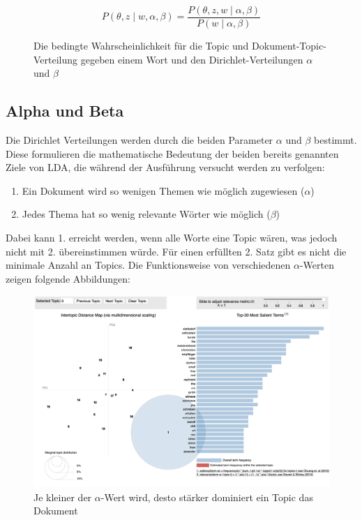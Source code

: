 \documentclass[german,version-2020-11]{uzl-thesis}
\begin{document}
\begin{figure}[h]
\begin{center}
\begin{equation}
P(\theta, z \mid w, \alpha, \beta) = \frac{P(\theta, z, w \mid \alpha, \beta)}{P(w \mid \alpha, \beta)}
\end{equation}
\end{center}
\caption{Die bedingte Wahrscheinlichkeit für die Topic und Dokument-Topic-Verteilung gegeben einem Wort und den Dirichlet-Verteilungen $\alpha$ und $\beta$}
\label{fig:equ2}
\end{figure}


\subsection{Alpha und Beta}
Die Dirichlet Verteilungen werden durch die beiden Parameter $\alpha$ und $\beta$ bestimmt. Diese formulieren die mathematische Bedeutung der beiden bereits genannten Ziele von LDA, die während der Ausführung versucht werden zu verfolgen:

\begin{enumerate}
	\item Ein Dokument wird so wenigen Themen wie möglich zugewiesen ($\alpha$)
	\item Jedes Thema hat so wenig relevante Wörter wie möglich ($\beta$)
\end{enumerate}

Dabei kann 1. erreicht werden, wenn alle Worte eine Topic wären, was jedoch nicht mit 2. übereinstimmen würde. Für einen erfüllten 2. Satz gibt es nicht die minimale Anzahl an Topics. Die Funktionsweise von verschiedenen $\alpha$-Werten zeigen folgende Abbildungen: \\

\begin{figure}[h]
\begin{center}
\includegraphics[scale=0.315]{lda_alpha001.png}
\caption{Je kleiner der $\alpha$-Wert wird, desto stärker dominiert ein Topic das Dokument} 
\label{fig:img1}
\end{center}
\end{figure}
\end{document}
